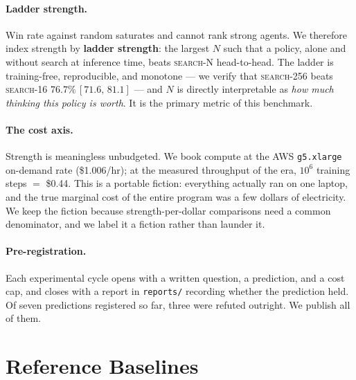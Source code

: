 \documentclass[11pt]{article}
\newcommand{\searchn}[1]{\textsc{search}-#1}
\newcommand{\ci}[2]{\,[#1,\,#2]}
\begin{document}
\paragraph{Ladder strength.} Win rate against random saturates and cannot rank strong agents. We therefore index strength by \textbf{ladder strength}: the largest $N$ such that a policy, alone and without search at inference time, beats \searchn{N} head-to-head. The ladder is training-free, reproducible, and monotone --- we verify that \searchn{256} beats \searchn{16} $76.7\%\ci{71.6}{81.1}$ --- and $N$ is directly interpretable as \emph{how much thinking this policy is worth}. It is the primary metric of this benchmark.

\paragraph{The cost axis.} Strength is meaningless unbudgeted. We book compute at the AWS \texttt{g5.xlarge} on-demand rate (\$1.006/hr); at the measured throughput of the era, $10^{6}$ training steps $=$ \$0.44. This is a portable fiction: everything actually ran on one laptop, and the true marginal cost of the entire program was a few dollars of electricity. We keep the fiction because strength-per-dollar comparisons need a common denominator, and we label it a fiction rather than launder it.

\paragraph{Pre-registration.} Each experimental cycle opens with a written question, a prediction, and a cost cap, and closes with a report in \texttt{reports/} recording whether the prediction held. Of seven predictions registered so far, three were refuted outright. We publish all of them.

\section{Reference Baselines}
\label{sec:baselines}
\end{document}
